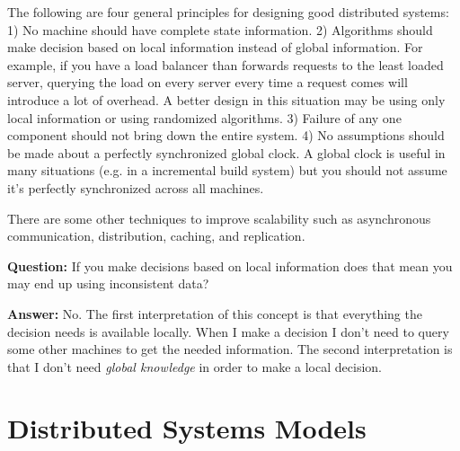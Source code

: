 \documentclass[twoside]{article}
\begin{document}
The following are four general principles for designing good distributed systems: 
1) No machine should have complete state information.
2) Algorithms should make decision based on local information instead of global information. For example, if you have a load balancer than forwards requests to the least loaded server, querying the load on every server every time a request comes will introduce a lot of overhead. A better design in this situation may be using only local information or using randomized algorithms.
3) Failure of any one component should not bring down the entire system.
4) No assumptions should be made about a perfectly synchronized global clock. A global clock is useful in many situations (e.g. in a incremental build system) but you should not assume it's perfectly synchronized across all machines.

There are some other techniques to improve scalability such as asynchronous communication, distribution, caching, and replication.

\textbf{Question:} If you make decisions based on local information does that mean you may end up using inconsistent data?

\textbf{Answer:} No. The first interpretation of this concept is that everything the decision needs is available locally. When I make a decision I don't need to query some other machines to get the needed information. The second interpretation is that I don't need \textit{global knowledge} in order to make a local decision.

\section{Distributed Systems Models}
\end{document}
